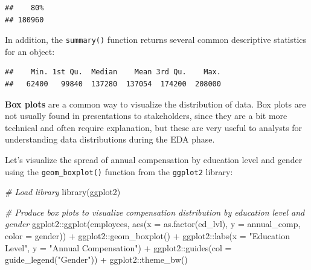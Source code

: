\documentclass[
]{book}
\newenvironment{Shaded}{\begin{snugshade}}{\end{snugshade}}
\newcommand{\AttributeTok}[1]{\textcolor[rgb]{0.77,0.63,0.00}{#1}}
\newcommand{\CommentTok}[1]{\textcolor[rgb]{0.56,0.35,0.01}{\textit{#1}}}
\newcommand{\FunctionTok}[1]{\textcolor[rgb]{0.00,0.00,0.00}{#1}}
\newcommand{\NormalTok}[1]{#1}
\newcommand{\SpecialCharTok}[1]{\textcolor[rgb]{0.00,0.00,0.00}{#1}}
\newcommand{\StringTok}[1]{\textcolor[rgb]{0.31,0.60,0.02}{#1}}
\begin{document}
\begin{verbatim}
##    80% 
## 180960
\end{verbatim}

In addition, the \texttt{summary()} function returns several common descriptive statistics for an object:

\begin{Shaded}
\end{Shaded}

\begin{verbatim}
##    Min. 1st Qu.  Median    Mean 3rd Qu.    Max. 
##   62400   99840  137280  137054  174200  208000
\end{verbatim}

\textbf{Box plots} are a common way to visualize the distribution of data. Box plots are not usually found in presentations to stakeholders, since they are a bit more technical and often require explanation, but these are very useful to analysts for understanding data distributions during the EDA phase.

Let's visualize the spread of annual compensation by education level and gender using the \texttt{geom\_boxplot()} function from the \texttt{ggplot2} library:

\begin{Shaded}
\begin{Highlighting}[]
\CommentTok{\# Load library}
\FunctionTok{library}\NormalTok{(ggplot2)}

\CommentTok{\# Produce box plots to visualize compensation distribution by education level and gender}
\NormalTok{ggplot2}\SpecialCharTok{::}\FunctionTok{ggplot}\NormalTok{(employees, }\FunctionTok{aes}\NormalTok{(}\AttributeTok{x =} \FunctionTok{as.factor}\NormalTok{(ed\_lvl), }\AttributeTok{y =}\NormalTok{ annual\_comp, }\AttributeTok{color =}\NormalTok{ gender)) }\SpecialCharTok{+}
\NormalTok{ggplot2}\SpecialCharTok{::}\FunctionTok{geom\_boxplot}\NormalTok{() }\SpecialCharTok{+}
\NormalTok{ggplot2}\SpecialCharTok{::}\FunctionTok{labs}\NormalTok{(}\AttributeTok{x =} \StringTok{"Education Level"}\NormalTok{, }\AttributeTok{y =} \StringTok{"Annual Compensation"}\NormalTok{) }\SpecialCharTok{+} 
\NormalTok{ggplot2}\SpecialCharTok{::}\FunctionTok{guides}\NormalTok{(}\AttributeTok{col =} \FunctionTok{guide\_legend}\NormalTok{(}\StringTok{"Gender"}\NormalTok{)) }\SpecialCharTok{+}
\NormalTok{ggplot2}\SpecialCharTok{::}\FunctionTok{theme\_bw}\NormalTok{()}
\end{Highlighting}
\end{Shaded}
\end{document}
